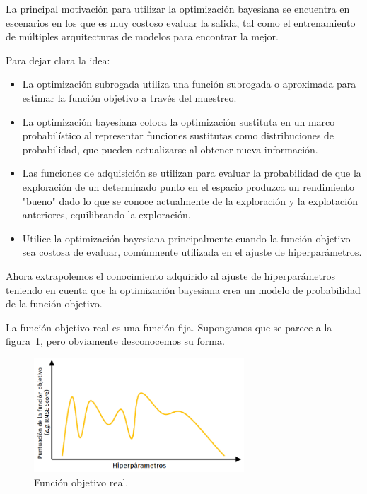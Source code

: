 \documentclass[a4paper,12pt]{article}
\begin{document}
\clearpage

La principal motivación para utilizar la optimización bayesiana se encuentra en escenarios en los que es muy costoso evaluar la salida, tal como el entrenamiento de múltiples arquitecturas de modelos para encontrar la mejor.

Para dejar clara la idea:

\begin{itemize}[noitemsep, topsep=2pt]
	\item La optimización subrogada utiliza una función subrogada o aproximada para estimar la función objetivo a través del muestreo.
	\item La optimización bayesiana coloca la optimización sustituta en un marco probabilístico al representar funciones sustitutas como distribuciones de probabilidad, que pueden actualizarse al obtener nueva información.
	\item Las funciones de adquisición se utilizan para evaluar la probabilidad de que la exploración de un determinado punto en el espacio produzca un rendimiento "bueno" dado lo que se conoce actualmente de la exploración y la explotación anteriores, equilibrando la exploración.
	\item Utilice la optimización bayesiana principalmente cuando la función objetivo sea costosa de evaluar, comúnmente utilizada en el ajuste de hiperparámetros.
\end{itemize}

Ahora extrapolemos el conocimiento adquirido al ajuste de hiperparámetros teniendo en cuenta que la optimización bayesiana crea un modelo de probabilidad de la función objetivo. \citep{Wang2020Apr}

La función objetivo real es una función fija. Supongamos que se parece a la figura~\ref{fig:bayes6}, pero obviamente desconocemos su forma.

\begin{figure}[H]
	\begin{center}
		\includegraphics[width=0.7\textwidth]{bayes_opt_6_v2.png}
		\caption{Función objetivo real.}
		\label{fig:bayes6}
	\end{center}
\end{figure}
\end{document}
